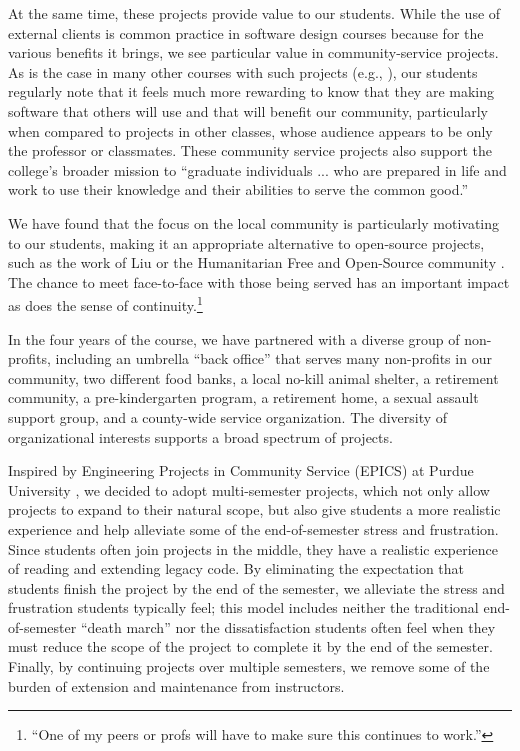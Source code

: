 At the same time, these projects provide value to our students.  While
the use of external clients is common practice in software design courses
because for the various benefits it brings, we see particular value in
community-service projects.  As
is the case in many other courses with such
projects (e.g., \cite{buckley-2004,coyle-2005,liu-2005,lange-2011,leidig-2006,hfoss-2018}), 
our students
regularly note that it feels much more rewarding to know that they are
making software that others will use and that will benefit our community,
particularly when compared to projects in other classes, whose audience
appears to be only the professor or classmates.
These community service projects also support
the college's broader mission to ``graduate individuals ... who are
prepared in life and work to use their knowledge and their abilities
to serve the common good.'' \cite{grinnell-mission}

We have found that the focus on the local community is particularly
motivating to our students, making it an appropriate alternative to
open-source projects, such as the work of Liu \cite{liu-2005} or the
Humanitarian Free and Open-Source community \cite{hfoss-2018}.
The chance to meet face-to-face with those being served has an important
impact as does the sense of continuity.\footnote{``One of my peers or
profs will have to make sure this continues to work.''}

In the four years of the course, we have partnered with a diverse
group of non-profits, including an umbrella ``back office'' that
serves many non-profits in our community, two different food banks,
a local no-kill animal shelter, a retirement community, a
pre-kindergarten program, a retirement home, a sexual assault support
group, and a county-wide service organization.  The diversity of
organizational interests supports a broad spectrum of projects.

Inspired by Engineering Projects in Community Service (EPICS) at
Purdue University \cite{coyle-2005}, we decided to adopt multi-semester
projects, which not only allow projects to expand to their natural
scope, but also give students a more realistic experience and help
alleviate some of the end-of-semester stress and frustration.  Since
students often join projects in the middle, they have a realistic
experience of reading and extending legacy code.  By eliminating the
expectation that students finish the project by the end of the
semester, we alleviate the stress and frustration students typically
feel; this model includes neither the traditional end-of-semester
``death march'' nor the dissatisfaction students often feel when 
they must reduce the scope of the project to complete it by the
end of the semester.  Finally, by continuing projects over multiple
semesters, we remove some of the burden of extension and maintenance
from instructors.

